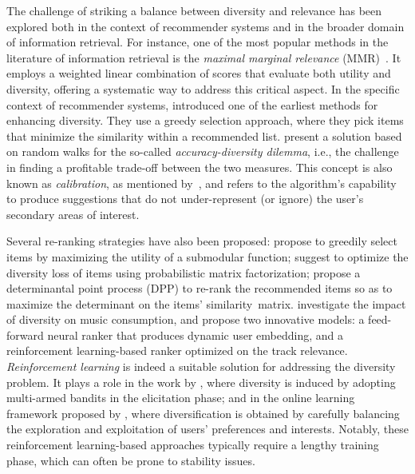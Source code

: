 \documentclass[a4paper,11pt]{article}
\begin{document}
The challenge of striking a balance between diversity and relevance has been explored both in the context of recommender systems and in the broader domain of information retrieval.
For instance, one of the most popular methods in the literature of information retrieval is the \emph{maximal marginal relevance} (MMR)~\cite{MMR}. It employs a weighted linear combination of scores that evaluate both utility and diversity, offering a systematic way to address this critical aspect. 
In the specific context of recommender systems, \citet{first_diversification} introduced one of the earliest methods for enhancing diversity. They use a greedy selection approach, where they pick items that minimize the similarity within a recommended list.
\citet{accuracy-diversity_dilemma} present a solution based on random walks for the so-called \textit{accuracy-diversity dilemma}, i.e., the challenge in finding a profitable trade-off between the two measures. 
This concept is also known as \textit{calibration}, as mentioned by~\citet{calibration}, and refers to the algorithm's capability to produce suggestions that do not under-represent (or ignore) the user's secondary areas of interest. 

Several re-ranking strategies have also been proposed:
\citet{dum} propose to greedily select items by maximizing the utility of a submodular function; 
\citet{dpmf} suggest to optimize the diversity loss of items using probabilistic matrix factorization; 
\citet{dpp} propose a determinantal point process (DPP) to re-rank the recommended items so as to maximize the determinant on the items' similarity~matrix. \citet{diverse_content} investigate the impact of diversity on music consumption, and propose two innovative models: a feed-forward neural ranker that produces dynamic user embedding, and a reinforcement learning-based ranker optimized on the track relevance. 
\emph{Reinforcement learning} is indeed a suitable solution for addressing the diversity problem. It plays a role in the work by \citet{multi-armed}, 
where diversity is induced by adopting multi-armed bandits in the elicitation phase; and in the online learning framework proposed by \citet{linear_bandits}, where diversification is obtained by carefully balancing the exploration and exploitation of users' preferences and interests.
Notably, these reinforcement learning-based approaches typically require a lengthy training phase, which can often be prone to stability issues. 
\end{document}
